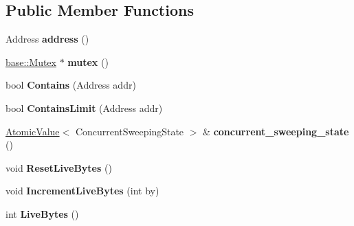 \subsection*{Public Member Functions}
\begin{DoxyCompactItemize}
\item 
Address {\bfseries address} ()\hypertarget{classv8_1_1internal_1_1_memory_chunk_ae2a42f2abeb57a8206eee9ff85a07ec6}{}\label{classv8_1_1internal_1_1_memory_chunk_ae2a42f2abeb57a8206eee9ff85a07ec6}

\item 
\hyperlink{classv8_1_1base_1_1_mutex}{base\+::\+Mutex} $\ast$ {\bfseries mutex} ()\hypertarget{classv8_1_1internal_1_1_memory_chunk_a8f584c3703d4785a6e6693af638c6ce5}{}\label{classv8_1_1internal_1_1_memory_chunk_a8f584c3703d4785a6e6693af638c6ce5}

\item 
bool {\bfseries Contains} (Address addr)\hypertarget{classv8_1_1internal_1_1_memory_chunk_a1c39761f226a79df38a27e8c6e80d17d}{}\label{classv8_1_1internal_1_1_memory_chunk_a1c39761f226a79df38a27e8c6e80d17d}

\item 
bool {\bfseries Contains\+Limit} (Address addr)\hypertarget{classv8_1_1internal_1_1_memory_chunk_a3c63106e1a91ed8f9ae53fdda7a475f0}{}\label{classv8_1_1internal_1_1_memory_chunk_a3c63106e1a91ed8f9ae53fdda7a475f0}

\item 
\hyperlink{classv8_1_1internal_1_1_atomic_value}{Atomic\+Value}$<$ Concurrent\+Sweeping\+State $>$ \& {\bfseries concurrent\+\_\+sweeping\+\_\+state} ()\hypertarget{classv8_1_1internal_1_1_memory_chunk_a9b0c133f14775ed30b34a45a12730f90}{}\label{classv8_1_1internal_1_1_memory_chunk_a9b0c133f14775ed30b34a45a12730f90}

\item 
void {\bfseries Reset\+Live\+Bytes} ()\hypertarget{classv8_1_1internal_1_1_memory_chunk_a8ef1d427e8915eed249457382e562a0a}{}\label{classv8_1_1internal_1_1_memory_chunk_a8ef1d427e8915eed249457382e562a0a}

\item 
void {\bfseries Increment\+Live\+Bytes} (int by)\hypertarget{classv8_1_1internal_1_1_memory_chunk_a246e44a97d210359edeb434896f26b2b}{}\label{classv8_1_1internal_1_1_memory_chunk_a246e44a97d210359edeb434896f26b2b}

\item 
int {\bfseries Live\+Bytes} ()\hypertarget{classv8_1_1internal_1_1_memory_chunk_a1ee6cbf1d7466945aa5d8ae062ff602f}{}\label{classv8_1_1internal_1_1_memory_chunk_a1ee6cbf1d7466945aa5d8ae062ff602f}


\end{DoxyCompactItemize}
